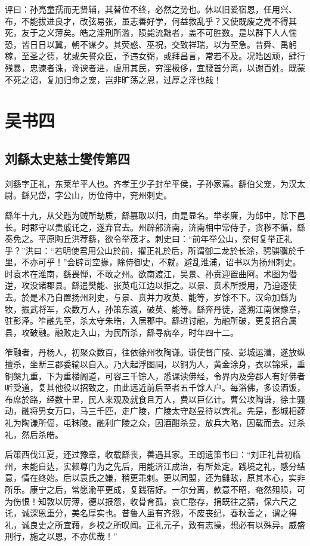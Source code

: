 \documentclass[12pt,UTF8]{ctexbook}
\begin{document}
评曰：孙亮童孺而无贤辅，其替位不终，必然之势也。休以旧爱宿恩，任用兴、布，不能拔进良才，改弦易张，虽志善好学，何益救乱乎？又使既废之亮不得其死，友于之义薄矣。皓之淫刑所滥，陨毙流黜者，盖不可胜数。是以群下人人惴恐，皆日日以冀，朝不谋夕。其荧惑、巫祝，交致祥瑞，以为至急。昔舜、禹躬稼，至圣之德，犹或矢誓众臣，予违女弼，或拜昌言，常若不及。况皓凶顽，肆行残暴，忠谏者诛，谗谀者进，虐用其民，穷淫极侈，宜腰首分离，以谢百姓。既蒙不死之诏，复加归命之宠，岂非旷荡之恩，过厚之泽也哉！

\part{吴书四}
\chapter{刘繇太史慈士燮传第四}

刘繇字正礼，东莱牟平人也。齐孝王少子封牟平侯，子孙家焉。繇伯父宠，为汉太尉。繇兄岱，字公山，历位侍中，兖州刺史。

繇年十九，从父韪为贼所劫质，繇篡取以归，由是显名。举孝廉，为郎中，除下邑长。时郡守以贵戚讬之，遂弃官去。州辟部济南，济南相中常侍子，贪秽不循，繇奏免之。平原陶丘洪荐繇，欲令举茂才。刺史曰：“前年举公山，奈何复举正礼乎？”洪曰：“若明使君用公山於前，擢正礼於后，所谓御二龙於长涂，骋骐骥於千里，不亦可乎！”会辟司空掾，除侍御史，不就。避乱淮浦，诏书以为扬州刺史。时袁术在淮南，繇畏惮，不敢之州。欲南渡江，吴景、孙贲迎置曲阿。术图为僣逆，攻没诸郡县。繇遣樊能、张英屯江边以拒之。以景、贲术所授用，乃迫逐使去。於是术乃自置扬州刺史，与景、贲并力攻英、能等，岁馀不下。汉命加繇为牧，振武将军，众数万人，孙策东渡，破英、能等。繇奔丹徒，遂溯江南保豫章，驻彭泽。笮融先至，杀太守朱皓，入居郡中。繇进讨融，为融所破，更复招合属县，攻破融。融败走入山，为民所杀，繇寻病卒，时年四十二。

笮融者，丹杨人，初聚众数百，往依徐州牧陶谦。谦使督广陵、彭城运漕，遂放纵擅杀，坐断三郡委输以自入。乃大起浮图祠，以铜为人，黄金涂身，衣以锦采，垂铜槃九重，下为重楼阁道，可容三千馀人，悉课读佛经，令界内及旁郡人有好佛者听受道，复其他役以招致之，由此远近前后至者五千馀人户。每浴佛，多设酒饭，布席於路，经数十里，民人来观及就食且万人，费以巨亿计。曹公攻陶谦，徐土骚动，融将男女万口，马三千匹，走广陵，广陵太守赵昱待以宾礼。先是，彭城相薛礼为陶谦所偪，屯秣陵。融利广陵之众，因酒酣杀昱，放兵大略，因载而去。过杀礼，然后杀皓。

后策西伐江夏，还过豫章，收载繇丧，善遇其家。王朗遗策书曰：“刘正礼昔初临州，未能自达，实赖尊门为之先后，用能济江成治，有所处定。践境之礼，感分结意，情在终始。后以袁氏之嫌，稍更乖剌。更以同盟，还为雠敌，原其本心，实非所乐。康宁之后，常愿渝平更成，复践宿好。一尔分离，款意不昭，奄然殂陨，可为伤恨！知敦以厉薄，德以报怨，收骨育孤，哀亡愍存，捐既往之猜，保六尺之讬，诚深恩重分，美名厚实也。昔鲁人虽有齐怨，不废丧纪，春秋善之，谓之得礼，诚良史之所宜藉，乡校之所叹闻。正礼元子，致有志操，想必有以殊异。威盛刑行，施之以恩，不亦优哉！”
\end{document}
